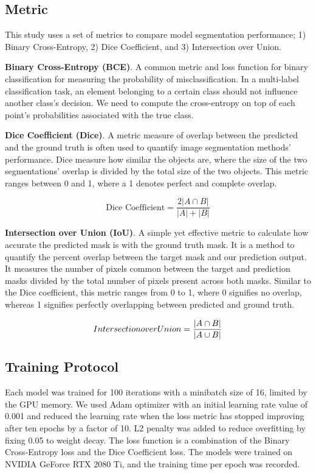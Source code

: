 \documentclass[conference]{IEEEtran}
\begin{document}
\subsection{Metric}

This study uses a set of metrics to compare model segmentation performance; 1) Binary Cross-Entropy, 2) Dice Coefficient, and 3) Intersection over Union.

\textbf{Binary Cross-Entropy (BCE)}. A common metric and loss function for binary classification for measuring the probability of misclassification. In a multi-label classification task, an element belonging to a certain class should not influence another class's decision. We need to compute the cross-entropy on top of each point's probabilities associated with the true class.

\textbf{Dice Coefficient (Dice)}. A metric measure of overlap between the predicted and the ground truth is often used to quantify image segmentation methods' performance. Dice measure how similar the objects are, where the size of the two segmentations' overlap is divided by the total size of the two objects. This metric ranges between 0 and 1, where a 1 denotes perfect and complete overlap.

\begin{equation}
\mbox{Dice Coefficient} = \frac{2 |A \cap B|}{|A| + |B|}
\end{equation}

\textbf{Intersection over Union (IoU)}. A simple yet effective metric to calculate how accurate the predicted mask is with the ground truth mask. It is a method to quantify the percent overlap between the target mask and our prediction output. It measures the number of pixels common between the target and prediction masks divided by the total number of pixels present across both masks. Similar to the Dice coefficient, this metric ranges from 0 to 1, where 0 signifies no overlap, whereas 1 signifies perfectly overlapping between predicted and ground truth.

\begin{equation}
\mbox{Intersection over Union} = {{|A \cap B|}\over{|A \cup B|}}
\end{equation}

\subsection{Training Protocol}

Each model was trained for 100 iterations with a minibatch size of 16, limited by the GPU memory. We used Adam optimizer with an initial learning rate value of 0.001 and reduced the learning rate when the loss metric has stopped improving after ten epochs by a factor of 10. L2 penalty was added to reduce overfitting by fixing 0.05 to weight decay. The loss function is a combination of the Binary Cross-Entropy loss and the Dice Coefficient loss. The models were trained on NVIDIA GeForce RTX 2080 Ti, and the training time per epoch was recorded.
\end{document}
